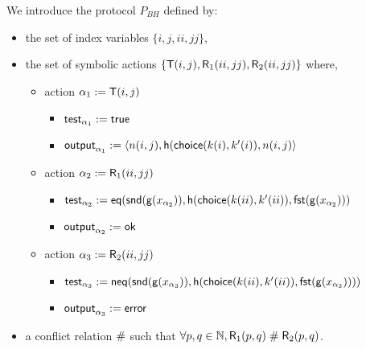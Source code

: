 \begin{example}
  \label{ex:basic-hash-bi-process}
  We introduce the protocol $P_{BH}$ defined by:
  \begin{itemize}
    \item the set of index variables $\{i,j,ii,jj\}$,
    \item the set of symbolic actions $\{\textsf{T}(i,j),\textsf{R}_1(ii,jj),\textsf{R}_2(ii,jj)\}$ where,
    \begin{itemize}
      \item action $\alpha_1 := \textsf{T}(i,j)$
        \begin{itemize}
          \item $\textsf{test}_{\alpha_1} := \textsf{true}$
          \item $\textsf{output}_{\alpha_1} := \langle n(i,j), \mathsf{h}(\mathsf{choice}(k(i),k'(i)),n(i,j) \rangle$
        \end{itemize}
      \item action $\alpha_2 := \textsf{R}_1(ii,jj)$
        \begin{itemize}
          \item $\textsf{test}_{\alpha_2} := \mathsf{eq}(\mathsf{snd}(\mathsf{g}(x_{\alpha_2})),  \mathsf{h}(\mathsf{choice}(k(ii),k'(ii)),\mathsf{fst}(\mathsf{g}(x_{\alpha_2})))$
          \item $\textsf{output}_{\alpha_2} := \mathsf{ok}$
        \end{itemize}
      \item action $\alpha_3 := \textsf{R}_2(ii,jj)$
        \begin{itemize}
          \item $\textsf{test}_{\alpha_3} := \mathsf{neq} (\mathsf{snd}(\mathsf{g}(x_{\alpha_3})),  \mathsf{h}(\mathsf{choice}(k(ii),k'(ii)),\mathsf{fst}(\mathsf{g}(x_{\alpha_3}))))$
          \item $\textsf{output}_{\alpha_3} := \mathsf{error}$
        \end{itemize}
    \end{itemize}
    \item a conflict relation $\mathrel{\#}$ such that $\forall p,q \in \mathbb{N}, \textsf{R}_1(p,q)\mathrel{\#}\textsf{R}_2(p,q)$.
  \end{itemize}
\end{example}

